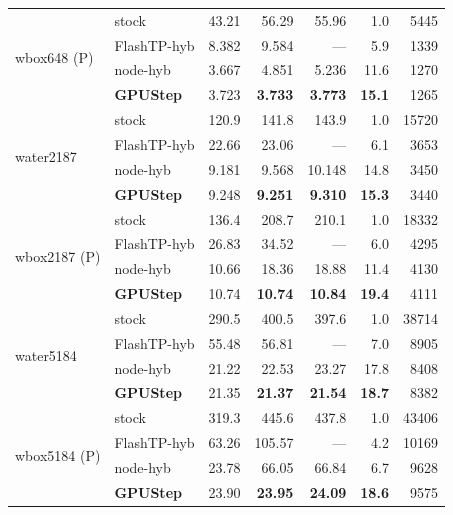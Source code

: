 \begin{table}[p]
\begin{tabular}{llrrrrr}
\midrule
\multirow{4}{*}{wbox648 (P)} & stock & 43.21 & 56.29 & 55.96 & 1.0 & 5445 \\
 & FlashTP-hyb & 8.382 & 9.584 & --- & 5.9 & 1339 \\
 & node-hyb & 3.667 & 4.851 & 5.236 & 11.6 & 1270 \\
 & \textbf{GPUStep} & 3.723 & \textbf{3.733} & \textbf{3.773} & \textbf{15.1} & 1265 \\
\midrule
\multirow{4}{*}{water2187} & stock & 120.9 & 141.8 & 143.9 & 1.0 & 15720 \\
 & FlashTP-hyb & 22.66 & 23.06 & --- & 6.1 & 3653 \\
 & node-hyb & 9.181 & 9.568 & 10.148 & 14.8 & 3450 \\
 & \textbf{GPUStep} & 9.248 & \textbf{9.251} & \textbf{9.310} & \textbf{15.3} & 3440 \\
\midrule
\multirow{4}{*}{wbox2187 (P)} & stock & 136.4 & 208.7 & 210.1 & 1.0 & 18332 \\
 & FlashTP-hyb & 26.83 & 34.52 & --- & 6.0 & 4295 \\
 & node-hyb & 10.66 & 18.36 & 18.88 & 11.4 & 4130 \\
 & \textbf{GPUStep} & 10.74 & \textbf{10.74} & \textbf{10.84} & \textbf{19.4} & 4111 \\
\midrule
\multirow{4}{*}{water5184} & stock & 290.5 & 400.5 & 397.6 & 1.0 & 38714 \\
 & FlashTP-hyb & 55.48 & 56.81 & --- & 7.0 & 8905 \\
 & node-hyb & 21.22 & 22.53 & 23.27 & 17.8 & 8408 \\
 & \textbf{GPUStep} & 21.35 & \textbf{21.37} & \textbf{21.54} & \textbf{18.7} & 8382 \\
\midrule
\multirow{4}{*}{wbox5184 (P)} & stock & 319.3 & 445.6 & 437.8 & 1.0 & 43406 \\
 & FlashTP-hyb & 63.26 & 105.57 & --- & 4.2 & 10169 \\
 & node-hyb & 23.78 & 66.05 & 66.84 & 6.7 & 9628 \\
 & \textbf{GPUStep} & 23.90 & \textbf{23.95} & \textbf{24.09} & \textbf{18.6} & 9575 \\
\bottomrule
\end{tabular}
\end{table}

